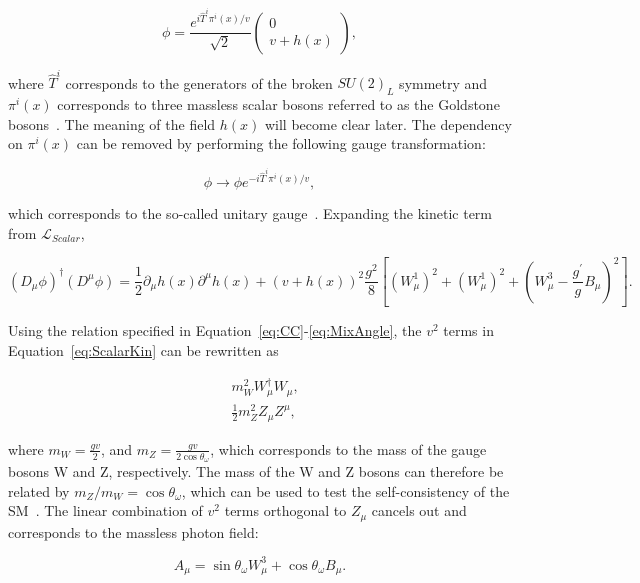 \begin{equation}
\phi=\frac{e^{i\hat{T}^{i}\pi^{i}(x)/v}}{\sqrt{2}}\begin{pmatrix}0\\v+h(x)\end{pmatrix},
\end{equation}

where $\hat{T}^{i}$ corresponds to the generators of the broken $SU(2)_{L}$ symmetry and $\pi^{i}(x)$ corresponds to three massless scalar bosons referred to as the Goldstone bosons~\cite{Goldstone:1962es}. The meaning of the field $h(x)$ will become clear later. The dependency on $\pi^{i}(x)$ can be removed by performing the following gauge transformation:

\begin{equation}
\phi\rightarrow\phi e^{-i\hat{T}^{i}\pi^{i}(x)/v},
\end{equation}

which corresponds to the so-called unitary gauge~\cite{Weinberg:1971fb}. Expanding the kinetic term from $\mathcal{L}_{Scalar}$,

\begin{equation}
\label{eq:ScalarKin}
(D_{\mu}\phi)^{\dagger}(D^{\mu}\phi)=\frac{1}{2}\partial_{\mu}h(x)\partial^{\mu}h(x)+(v+h(x))^2\frac{g^2}{8}[(W_{\mu}^1)^2+(W_{\mu}^1)^2+(W_{\mu}^3-\frac{g^{\prime}}{g}B_{\mu})^2].
\end{equation}

Using the relation specified in Equation~\ref{eq:CC}-\ref{eq:MixAngle}, the $v^2$ terms in Equation~\ref{eq:ScalarKin} can be rewritten as 

\begin{equation}
\begin{split}
&m_{W}^2W^{\dagger}_{\mu}W_{\mu},\\
&\frac{1}{2}m_{Z}^2Z_{\mu}Z^{\mu},
\end{split}
\end{equation}

where $m_{W}=\frac{gv}{2}$, and $m_{Z}=\frac{gv}{2\cos\theta_{\omega}}$, which corresponds to the mass of the gauge bosons W and Z, respectively. The mass of the W and Z bosons can therefore be related by $m_{Z}/m_{W}=\cos\theta_{\omega}$, which can be used to test the self-consistency of the \ac{SM}~\cite{CDF:2022hxs}. The linear combination of $v^2$ terms orthogonal to $Z_{\mu}$ cancels out and corresponds to the massless photon field:

\begin{equation}
A_{\mu}=\sin\theta_{\omega}W_{\mu}^3+\cos\theta_{\omega}B_{\mu}.
\end{equation}  

